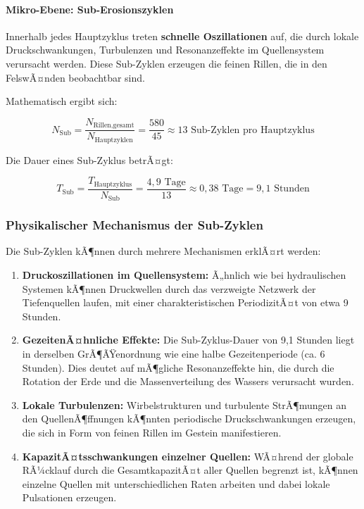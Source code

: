 \paragraph{Mikro-Ebene: Sub-Erosionszyklen}

Innerhalb jedes Hauptzyklus treten \textbf{schnelle Oszillationen} auf, die durch lokale Druckschwankungen, Turbulenzen und Resonanzeffekte im Quellensystem verursacht werden. Diese Sub-Zyklen erzeugen die feinen Rillen, die in den FelswÃ¤nden beobachtbar sind.

Mathematisch ergibt sich:

\begin{equation}
	N_{\text{Sub}} = \frac{N_{\text{Rillen,gesamt}}}{N_{\text{Hauptzyklen}}} = \frac{580}{45} \approx 13 \text{ Sub-Zyklen pro Hauptzyklus}
\end{equation}

Die Dauer eines Sub-Zyklus betrÃ¤gt:

\begin{equation}
	T_{\text{Sub}} = \frac{T_{\text{Hauptzyklus}}}{N_{\text{Sub}}} = \frac{4{,}9 \text{ Tage}}{13} \approx 0{,}38 \text{ Tage} = 9{,}1 \text{ Stunden}
\end{equation}

\subsubsection{Physikalischer Mechanismus der Sub-Zyklen}

Die Sub-Zyklen kÃ¶nnen durch mehrere Mechanismen erklÃ¤rt werden:

\begin{enumerate}
	\item \textbf{Druckoszillationen im Quellensystem:} Ã„hnlich wie bei hydraulischen Systemen kÃ¶nnen Druckwellen durch das verzweigte Netzwerk der Tiefenquellen laufen, mit einer charakteristischen PeriodizitÃ¤t von etwa 9 Stunden.
	
	\item \textbf{GezeitenÃ¤hnliche Effekte:} Die Sub-Zyklus-Dauer von 9,1 Stunden liegt in derselben GrÃ¶ÃŸenordnung wie eine halbe Gezeitenperiode (ca. 6 Stunden). Dies deutet auf mÃ¶gliche Resonanzeffekte hin, die durch die Rotation der Erde und die Massenverteilung des Wassers verursacht wurden.
	
	\item \textbf{Lokale Turbulenzen:} Wirbelstrukturen und turbulente StrÃ¶mungen an den QuellenÃ¶ffnungen kÃ¶nnten periodische Druckschwankungen erzeugen, die sich in Form von feinen Rillen im Gestein manifestieren.
	
	\item \textbf{KapazitÃ¤tsschwankungen einzelner Quellen:} WÃ¤hrend der globale RÃ¼cklauf durch die GesamtkapazitÃ¤t aller Quellen begrenzt ist, kÃ¶nnen einzelne Quellen mit unterschiedlichen Raten arbeiten und dabei lokale Pulsationen erzeugen.
\end{enumerate}

